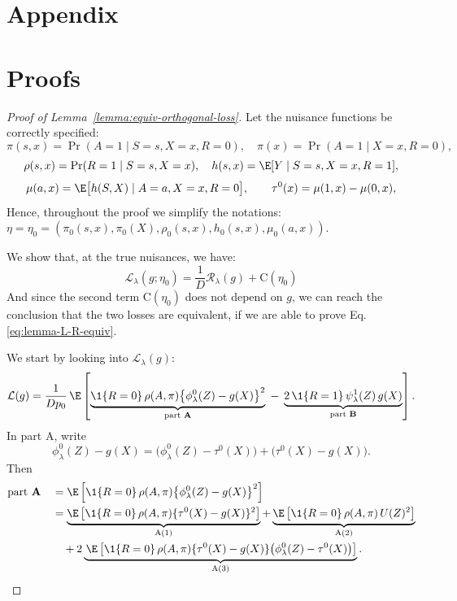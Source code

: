 \documentclass{article} %
\theoremstyle{plain} %
\theoremstyle{definition} %
\theoremstyle{remark} %
\begin{document}



\appendix
\section{Appendix}
\section{Proofs}
\label{app:proofs}
\begin{proof}[Proof of Lemma~\ref{lemma:equiv-orthogonal-loss}]
Let the nuisance functions be correctly specified:
\[
\pi(s,x)=\Pr(A=1\mid S=s,X=x,R=0),\quad
\pi(x)=\Pr(A=1\mid X=x,R=0),
\]
\[
\rho(s,x)=\Pr(R=1\mid S=s,X=x),\quad
h(s,x)=\E[Y\mid S=s,X=x,R=1],
\]
\[
\mu(a,x)=\E\big[h(S,X)\mid A=a,X=x,R=0\big],\qquad
\tau^0(x)=\mu(1,x)-\mu(0,x),
\]
Hence, throughout the proof we simplify the notations: $\eta=\eta_0=(\pi_0(s,x),\pi_0(X),\rho_0(s,x),h_0(s,x),\mu_0(a,x))$. 

We show that, at the true nuisances, we have:
\begin{equation}
    \label{eq:lemma-L-R-equiv}
    \mathcal{L}_\lambda(g;\eta_0) = \frac{1}{D}\mathcal{R}_\lambda(g) + \text{C}(\eta_0)
\end{equation}
And since the second term $\text{C}(\eta_0)$ does not depend on $g$, we can reach the conclusion that the two losses are equivalent, if we are able to prove Eq.\ref{eq:lemma-L-R-equiv}.

We start by looking into $\mathcal{L}_\lambda(g)$:
\[
\mathcal{L}(g)=\frac{1}{Dp_0}\,
\E\left[\underbrace{\1\{R=0\}\,\rho(A,\pi)\big\{\phi^0_\lambda(Z)-g(X)\big\}^2}_{\text{part \textbf{A}}}
\;-\; \underbrace{2\,\1\{R=1\}\,\psi^1_\lambda(Z)\,g(X)}_{\text{part \textbf{B}}}\right].
\]
In part A, write
\[
\phi^0_\lambda(Z)-g(X)
=\big(\phi^0_\lambda(Z)-\tau^0(X)\big)+\big(\tau^0(X)-g(X)\big).
\]
Then
\begin{align}
\text{part \textbf{A}} & \quad =\E\left[\1\{R=0\}\,\rho(A,\pi)\big\{\phi^0_\lambda(Z)-g(X)\big\}^2\right]\\
&\quad=\underbrace{\E\left[\1\{R=0\}\,\rho(A,\pi)\{\tau^0(X)-g(X)\}^2\right]}_{\text{A(1)}}  + \underbrace{\E\left[\1\{R=0\}\,\rho(A,\pi)\,U(Z)^2\right]}_{\text{A(2)}} \\
&\qquad +2\underbrace{\,\E\left[\1\{R=0\}\,\rho(A,\pi)\{\tau^0(X)-g(X)\}\big(\phi^0_\lambda(Z)-\tau^0(X)\big)\right]}_{\text{A(3)}}.
\end{align}


\end{proof}
\end{document}
